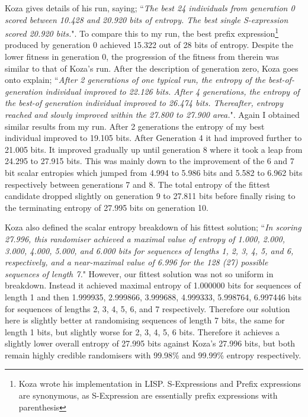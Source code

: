 \documentclass[a4paper,10.5pt]{article}
\begin{document}
Koza gives details of his run, saying; ``\emph{The best 24 individuals from generation 0 scored between 10.428 and 20.920 bits of entropy. The best single S-expression scored 20.920 bits.}". To compare this to my run, the best prefix expression\footnote{Koza wrote his implementation in LISP. S-Expressions and Prefix expressions are synonymous, as S-Expression are essentially prefix expressions with parenthesis} produced by generation 0 achieved 15.322 out of 28 bits of entropy.
Despite the lower fitness in generation 0, the progression of the fitness from therein was similar to that of Koza's run. After the description of generation zero, Koza goes onto explain; ``\emph{After 2 generations of one typical run, the entropy of the best-of-generation individual improved to 22.126 bits. After 4 generations, the entropy of the best-of generation individual improved to 26.474 bits. Thereafter, entropy reached and slowly improved within the 27.800 to 27.900 area.}". Again I obtained similar results from my run. After 2 generations the entropy of my best individual improved to 19.105 bits. After Generation 4 it had improved further to 21.005 bits. It improved gradually up until generation 8 where it took a leap from 24.295 to 27.915 bits. This was mainly down to the improvement of the 6 and 7 bit scalar entropies which jumped from 4.994 to 5.986 bits and 5.582 to 6.962 bits respectively between generations 7 and 8. The total entropy of the fittest candidate dropped slightly on generation 9 to 27.811 bits before finally rising to the terminating entropy of 27.995 bits on generation 10.

Koza also defined the scalar entropy breakdown of his fittest solution; ``\emph{In scoring 27.996, this randomiser achieved a maximal value of entropy of 1.000, 2.000, 3.000, 4.000, 5.000, and 6.000 bits for sequences of lengths 1, 2, 3, 4, 5, and 6, respectively, and a near-maximal value of 6.996 for the 128 (27) possible sequences of length 7.}" However, our fittest solution was not so uniform in breakdown. Instead it achieved maximal entropy of 1.000000 bits for sequences of length 1 and then 1.999935, 2.999866, 3.999688, 4.999333, 5.998764, 6.997446 bits for sequences of lengths 2, 3, 4, 5, 6, and 7 respectively. Therefore our solution here is slightly better at randomising sequences of length 7 bits, the same for length 1 bits, but slightly worse for 2, 3, 4, 5, 6 bits. Therefore it achieves a slightly lower overall entropy of 27.995 bits against Koza's 27.996 bits, but both remain highly credible randomisers with 99.98\% and 99.99\% entropy respectively. 
\end{document}

